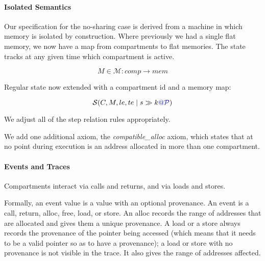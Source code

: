 \documentclass{article}
\begin{document}

\paragraph{Isolated Semantics}

Our specification for the no-sharing case is derived from a machine in which memory is
isolated by construction. Where previously we had a single flat memory, we now have a
map from compartments to flat memories. The state tracks at any given time which compartment
is active.

\[M \in \mathcal{M} : \mathit{comp} \rightarrow \mathit{mem}\]

Regular state now extended with a compartment id and a memory map:

\[\mathcal{S}(C, M, le, te \mid s \gg k {\color{blue} @} \mathcal{\color{blue} P\mathit{}})\]

We adjust all of the step relation rules appropriately.

We add one additional axiom, the {\it compatible\_alloc} axiom, which states that
at no point during execution is an address allocated in more than one compartment.

\paragraph{Events and Traces}

Compartments interact via calls and returns, and via loads and stores.

Formally, an event value is a value with an optional provenance. An event is a call, return,
alloc, free, load, or store. An alloc records the range of addresses that are allocated and
gives them a unique provenance. A load or a store always records the provenance of the pointer
being accessed (which means that it needs to be a valid pointer so as to have a provenance);
a load or store with no provenance is not visible in the trace. It also gives the range of
addresses affected.
\end{document}
